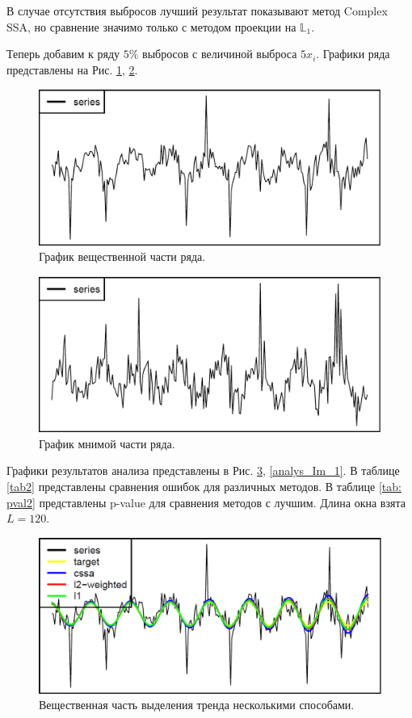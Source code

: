 \documentclass[specialist,
               substylefile = spbu.rtx,
               subf,href,colorlinks=true, 12pt]{disser}
\begin{document}
В случае отсутствия выбросов лучший результат показывают метод Complex SSA, но сравнение значимо только с методом проекции на $\mathbb{L}_1$.

Теперь добавим к ряду $5\%$ выбросов с величиной выброса $5x_i$. Графики ряда представлены на Рис. \ref{ser_Re_1}, \ref{ser_Im_1}.

\begin{figure}[H]
	\begin{center}
		\includegraphics[width=0.67\linewidth]{img/ser_1_Re.png}
	\end{center}
	\caption{График вещественной части ряда.}
	\label{ser_Re_1}
\end{figure}

\begin{figure}[H]
	\begin{center}
		\includegraphics[width=0.67\linewidth]{img/ser_1_Im.png}
	\end{center}
	\caption{График мнимой части ряда.}
	\label{ser_Im_1}
\end{figure}

Графики результатов анализа представлены в Рис. \ref{analys_Re_1}, \ref{analys_Im_1}. В таблице \ref{tab2} представлены сравнения ошибок для различных методов.  В таблице \ref{tab: pval2} представлены p-value для сравнения методов с лучшим. Длина окна взята $L = 120$.

\begin{figure}[H]
	\begin{center}
		\includegraphics[width=0.67\linewidth]{img/analys_1_Re.png}
	\end{center}
	\caption{Вещественная часть выделения тренда несколькими способами.}
	\label{analys_Re_1}
\end{figure}
\end{document}

